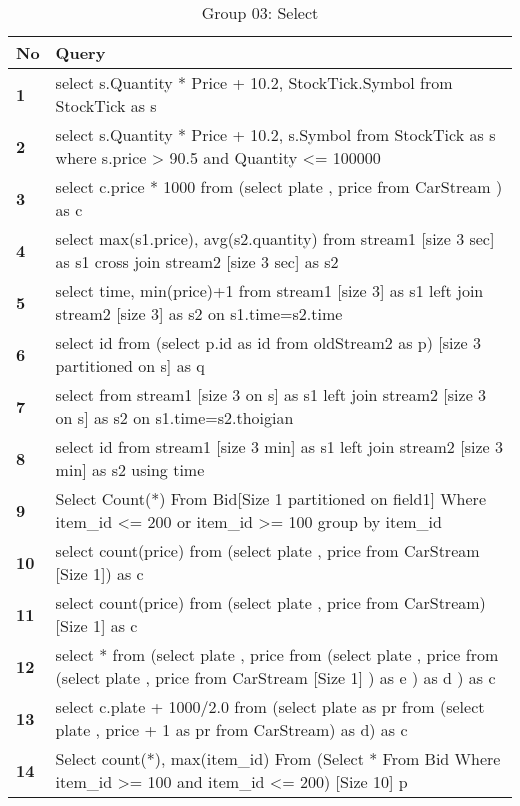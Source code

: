 \begin{table}[h]
\caption{Group 03: Select}
\centering
\label{table:selectTest}
\setlength\extrarowheight{5pt}
\begin{tabular}{||>{\centering\bfseries}m{0.5in}|>{\centering\arraybackslash}m{5in}||}
\hline
\textbf{No} & \textbf{Query} \\ \hline\hline
     	1	   &  select s.Quantity * Price + 10.2, StockTick.Symbol from StockTick as s \\ \hline
        2 &  select s.Quantity * Price + 10.2, s.Symbol from StockTick as s where s.price > 90.5 and Quantity <= 100000 \\ \hline
        3 &  select c.price * 1000 from (select plate , price  from CarStream ) as c \\ \hline
       4  &  select max(s1.price), avg(s2.quantity) from stream1 [size 3 sec] as s1 cross join stream2 [size 3 sec] as s2 \\ \hline
       5  &  select time, min(price)+1 from stream1 [size 3] as s1 left join stream2 [size 3] as s2 on s1.time=s2.time \\ \hline
       6  &  select id from (select p.id as id from oldStream2 as p) [size 3 partitioned on s] as q \\ \hline
       7  &  select  from stream1 [size 3 on s] as s1 left join stream2 [size 3 on s] as s2 on s1.time=s2.thoigian \\ \hline
        8 &  select id from stream1 [size 3 min] as s1 left join stream2 [size 3 min] as s2 using time \\ \hline
        9 &  Select Count(*) From Bid[Size 1 partitioned on field1] Where  item\_id <= 200 or item\_id >= 100 group by item\_id \\ \hline
       10  &  select count(price) from (select plate , price  from CarStream [Size 1]) as c \\ \hline
       11  &  select count(price) from (select plate , price  from CarStream) [Size 1] as c \\ \hline
       12  &  select * from (select plate , price from (select plate , price from (select plate , price from CarStream [Size 1] ) as e ) as d ) as c \\ \hline
       13  &  select c.plate + 1000/2.0 from (select plate as pr from (select plate , price + 1 as pr from CarStream) as d) as c \\ \hline
        14 &  Select count(*), max(item\_id) From (Select * From Bid Where item\_id >= 100 and item\_id <= 200) [Size 10] p \\ \hline
    		           				
 \end{tabular}
\end{table}




